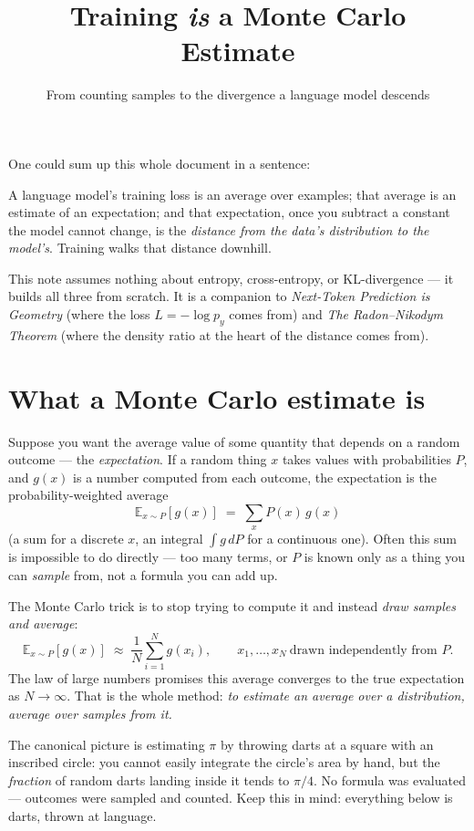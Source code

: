 \documentclass[11pt]{article}
\title{\color{inkblue}\bfseries Training \textit{is} a Monte Carlo Estimate}
\author{From counting samples to the divergence a language model descends}
\date{}
\begin{document}
\maketitle
\thispagestyle{empty}

One could sum up this whole document in a sentence:
\begin{summary}
A language model's training loss is an average over examples; that average is an estimate of
an expectation; and that expectation, once you subtract a constant the model cannot change,
is the \emph{distance from the data's distribution to the model's}. Training walks that
distance downhill.
\end{summary}
This note assumes nothing about entropy, cross-entropy, or KL-divergence --- it builds all
three from scratch. It is a companion to \emph{Next-Token Prediction is Geometry} (where the
loss $L = -\log p_y$ comes from) and \emph{The Radon--Nikodym Theorem} (where the density
ratio at the heart of the distance comes from).

\section{What a Monte Carlo estimate is}

Suppose you want the average value of some quantity that depends on a random outcome --- the
\emph{expectation}. If a random thing $x$ takes values with probabilities $P$, and $g(x)$ is
a number computed from each outcome, the expectation is the probability-weighted average
\[
  \mathbb{E}_{x \sim P}[g(x)] \;=\; \sum_x P(x)\, g(x)
\]
(a sum for a discrete $x$, an integral $\int g\,dP$ for a continuous one). Often this sum is
impossible to do directly --- too many terms, or $P$ is known only as a thing you can
\emph{sample} from, not a formula you can add up.

The Monte Carlo trick is to stop trying to compute it and instead \emph{draw samples and
average}:
\[
  \mathbb{E}_{x \sim P}[g(x)] \;\approx\; \frac{1}{N}\sum_{i=1}^{N} g(x_i),
  \qquad x_1, \dots, x_N \ \text{drawn independently from } P.
\]
The law of large numbers promises this average converges to the true expectation as
$N \to \infty$. That is the whole method: \emph{to estimate an average over a distribution,
average over samples from it.}

\begin{insight}
The canonical picture is estimating $\pi$ by throwing darts at a square with an inscribed
circle: you cannot easily integrate the circle's area by hand, but the \emph{fraction} of
random darts landing inside it tends to $\pi/4$. No formula was evaluated --- outcomes were
sampled and counted. Keep this in mind: everything below is darts, thrown at language.
\end{insight}
\end{document}
